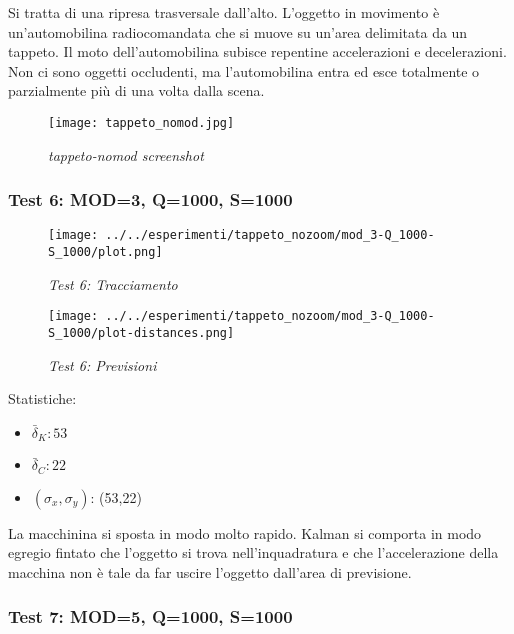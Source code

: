 Si tratta di una ripresa trasversale dall'alto. L'oggetto in movimento è un'automobilina radiocomandata che si muove su un'area delimitata da un tappeto. Il moto dell'automobilina subisce repentine accelerazioni e decelerazioni. Non ci sono oggetti occludenti, ma l'automobilina entra ed esce totalmente o parzialmente più di una volta dalla scena.

\begin{figure}[hb]
\centering
	\texttt{[image: tappeto\_nomod.jpg]}
\caption{\textit{tappeto-nomod screenshot}}
\end{figure}

\newpage
\subsubsection{Test 6: MOD=3, Q=1000, S=1000}

\begin{figure}[hb]
\centering
\texttt{[image: ../../esperimenti/tappeto\_nozoom/mod\_3-Q\_1000-S\_1000/plot.png]}
\caption{\textit{Test 6: Tracciamento}}
\end{figure}

\begin{figure}[hb]
\centering
\texttt{[image: ../../esperimenti/tappeto\_nozoom/mod\_3-Q\_1000-S\_1000/plot-distances.png]}
\caption{\textit{Test 6: Previsioni}}
\end{figure}

Statistiche:
\begin{itemize}
\item \begin{math} \bar \delta_K: 53 \end{math}
\item \begin{math} \bar \delta_C: 22 \end{math}
\item \begin{math}(\sigma_x,\sigma_y)\end{math}: (53,22)
\end{itemize}

La macchinina si sposta in modo molto rapido. Kalman si comporta in modo egregio fintato che l'oggetto si trova nell'inquadratura e che l'accelerazione della macchina non è tale da far uscire l'oggetto dall'area di previsione.

\newpage
\subsubsection{Test 7: MOD=5, Q=1000, S=1000}

